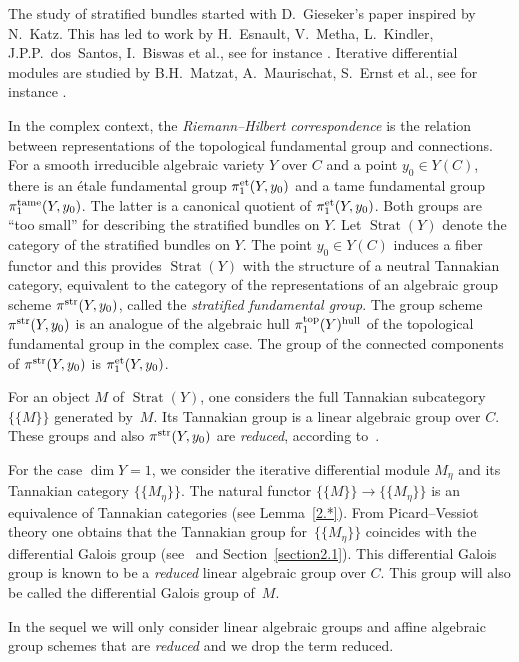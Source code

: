 \documentclass[10pt,a4paper]{amsart}
\numberwithin{equation}{section}
\begin{document}
The study of stratified bundles started with D.~Gieseker's paper \cite{Gie} inspired by N.~Katz. This has led to work by H.~Esnault, V.~Metha, L.~Kindler, J.P.P.~dos~Santos, I.~Biswas et al., see for instance \cite{Sa, Es,Es-M,K,Ki}. Iterative differential modules are studied by B.H.~Matzat, A.~Maurischat, S.~Ernst et al., see for instance \cite{Er, Ma-vdP2,R}.

In the complex context, the {\it Riemann--Hilbert correspondence} is the relation between representations of the topological fundamental group and connections. For a smooth irreducible algebraic variety $Y$ over $C$ and a point $y_0\in Y(C)$, there is an \'etale fundamental group $\pi^{\rm et}_1(Y,y_0)$ and a tame fundamental group $\pi_1^{\rm tame}(Y,y_0)$. The latter is a canonical quotient of $\pi^{\rm et}_1(Y,y_0)$. Both groups are ``too small'' for describing the stratified bundles on $Y$. Let $\operatorname{Strat}(Y)$ denote the category of the stratified bundles on $Y$. The point $y_0\in Y(C)$ induces a fiber functor and this provides $\operatorname{Strat}(Y)$
with the structure of a neutral Tannakian category, equivalent to the category of the representations of an algebraic group scheme $\pi^{\rm str}(Y,y_0)$, called the {\it stratified fundamental group}. The group scheme $\pi^{\rm str}(Y,y_0)$ is an analogue of the algebraic hull $\pi_1^{\rm top}(Y)^{\rm hull}$ of the topological fundamental group in the complex case. The group of the connected components of $\pi^{\rm str}(Y,y_0)$ is $\pi^{\rm et}_1(Y,y_0)$.

For an object $M$ of $\operatorname{Strat}(Y)$, one considers the full Tannakian subcategory $\{\{M\}\}$ generated by~$M$. Its Tannakian group is a linear algebraic group over $C$. These groups and also $\pi^{\rm str}(Y,y_0)$ are {\it reduced}, according to~\cite{Sa}.

For the case $\dim Y=1$, we consider the iterative differential module $M_\eta$ and its Tannakian category $\{\{M_\eta\}\}$. The natural functor $\{\{M\}\}\rightarrow \{\{M_\eta \}\}$ is an equivalence of Tannakian categories (see Lemma~\ref{2.*}). From Picard--Vessiot theory one obtains that the Tannakian group for~$\{\{M_\eta \}\}$ coincides with the differential Galois group (see~\cite{Ma-vdP1} and Section~\ref{section2.1}). This dif\-fe\-ren\-tial Galois group is known to be a {\it reduced} linear algebraic group over $C$. This group will also be called the differential Galois group of~$M$.

In the sequel we will only consider linear algebraic groups and affine algebraic group schemes that are {\it reduced} and we drop the term reduced.
\end{document}
